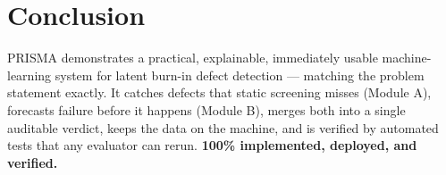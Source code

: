 \documentclass[11pt,a4paper]{article}
\begin{document}
\section{Conclusion}

\noindent PRISMA demonstrates a practical, explainable, immediately usable machine-learning system
for latent burn-in defect detection --- matching the problem statement exactly. It catches
defects that static screening misses (Module A), forecasts failure before it happens (Module B),
merges both into a single auditable verdict, keeps the data on the machine, and is verified by
automated tests that any evaluator can rerun. \textbf{100\% implemented, deployed, and verified.}
\end{document}
